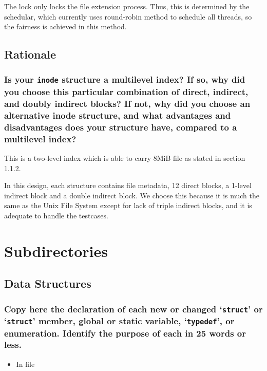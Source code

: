 \documentclass[sigconf, nonacm, balance=false, urlbreakonhyphens=true]{acmart}
\begin{document}
                The lock only locks the file extension process. Thus, this is determined by the schedular, which currently uses round-robin method to schedule all threads, so the fairness is achieved in this method. 
        
        \subsection{Rationale}
            
            \subsubsection{Is your \texttt{inode} structure a multilevel index?  If so, why did you choose this particular combination of direct, indirect, and doubly indirect blocks?  If not, why did you choose an alternative \texttt{}{inode} structure, and what advantages and disadvantages does your structure have, compared to a multilevel index? } 

                This is a two-level index which is able to carry 8MiB file as stated in section 1.1.2. 
                
                In this design, each structure contains file metadata, 12 direct blocks, a 1-level indirect block and a double indirect block. We choose this because it is much the same as the Unix File System except for lack of triple indirect blocks, and it is adequate to handle the testcases. 
    
    \section{Subdirectories}

        \label{Subdirectories}

        \subsection{Data Structures}
        
            \subsubsection{Copy here the declaration of each new or changed `\texttt{struct}' or `\texttt{struct}' member, global or static variable, `\texttt{typedef}', or enumeration. Identify the purpose of each in 25 words or less. }
    
                \begin{itemize}
                    \item In file \texttt{}
\begin{verbatim}
\end{verbatim}
                \end{itemize}
\end{document}
